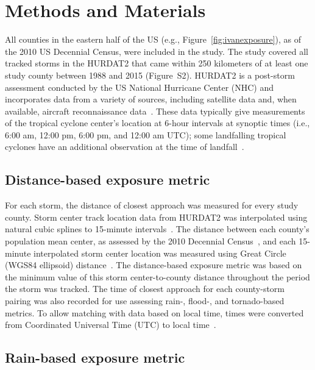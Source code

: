 \section*{Methods and Materials}

All counties in the eastern half of the \ac{US} (e.g., Figure~\ref{fig:ivanexposure}), 
as of the 2010 \ac{US} Decennial Census, were included in
the study. The study covered all tracked storms in the \ac{HURDAT2} \citep{landsea2013} 
that came within 250
kilometers of at least one study county between 1988 and 2015 (Figure~S2).
HURDAT2 is a post-storm assessment conducted by the \ac{US} National Hurricane
Center (NHC) and incorporates data from a variety of sources, including
satellite data and, when available, aircraft reconnaissance 
data~\citep{landsea2013, jarvinen1988}. These data typically give measurements of
the tropical cyclone center's location at 6-hour intervals at synoptic times
(i.e., 6:00 am, 12:00 pm, 6:00 pm, and 12:00 am UTC); some landfalling tropical
cyclones have an additional observation at the time of landfall~\citep{landsea2013}.

\subsection*{Distance-based exposure metric}

For each storm, the distance of closest approach was measured for every study county. 
Storm center track location data from \ac{HURDAT2} was 
interpolated using natural cubic splines to 15-minute intervals~\cite{hurricaneexposure}. 
The distance between each county's population mean center, as assessed by the 2010 Decennial
Census~\cite{countycenters}, and each 15-minute interpolated storm center location was
measured using Great Circle (WGS84 ellipsoid) distance~\cite{bivand2013applied}. The 
distance-based exposure metric was based on the minimum value of this storm 
center-to-county distance throughout the period the storm was tracked. The time of 
closest approach for each county-storm pairing was also recorded for use assessing 
rain-, flood-, and tornado-based metrics. To allow matching with data based on local 
time, times were converted from Coordinated Universal Time (UTC) to local 
time~\cite{countytimezones}.

\subsection*{Rain-based exposure metric}

